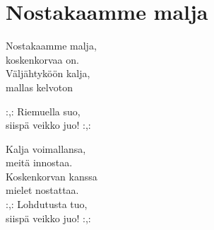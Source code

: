\section{Nostakaamme malja}

Nostakaamme malja, \\
koskenkorvaa on.\\
Väljähtyköön kalja, \\
mallas kelvoton

:,: Riemuella suo,\\
siispä veikko juo! :,:

Kalja voimallansa,\\
meitä innostaa. \\
Koskenkorvan kanssa \\
mielet nostattaa. \\
:,: Lohdutusta tuo, \\
siispä veikko juo! :,: